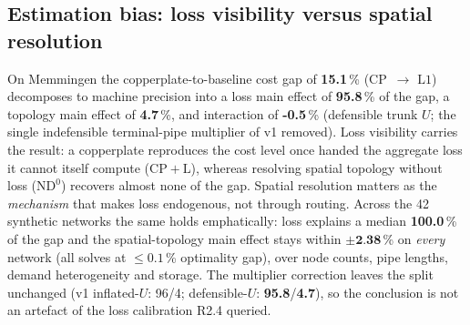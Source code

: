\documentclass[a4paper,fleqn]{cas-dc}
\newcommand{\CP}{\ensuremath{\mathrm{CP}}}      %
\newcommand{\CPL}{\ensuremath{\mathrm{CP{+}L}}} %
\newcommand{\NDz}{\ensuremath{\mathrm{ND^{0}}}} %
\newcommand{\Lone}{\ensuremath{\mathrm{L1}}}    %
\begin{document}
\subsection{Estimation bias: loss visibility versus spatial resolution}
On Memmingen the copperplate-to-baseline cost gap of \textbf{15.1}\,\%
(\CP\ $\to$ \Lone) decomposes to machine precision into a loss main effect of
\textbf{95.8}\,\% of the gap, a topology main effect of \textbf{4.7}\,\%,
and interaction of \textbf{-0.5}\,\% (defensible trunk $U$; the single
indefensible terminal-pipe multiplier of v1 removed). Loss visibility carries the
result: a copperplate reproduces the cost level once handed the aggregate loss it
cannot itself compute (\CPL), whereas resolving spatial topology without loss
(\NDz) recovers almost none of the gap. Spatial resolution matters as the
\emph{mechanism} that makes loss endogenous, not through routing. Across the 42
synthetic networks the same holds emphatically: loss explains a median
\textbf{100.0}\,\% of the gap and the spatial-topology main effect stays
within $\pm\textbf{2.38}$\,\% on \emph{every} network (all solves at
$\le0.1$\,\% optimality gap), over node counts, pipe lengths, demand heterogeneity and
storage. The multiplier correction leaves the split unchanged (v1 inflated-$U$: 96/4;
defensible-$U$: \textbf{95.8}/\textbf{4.7}), so the conclusion is not an
artefact of the loss calibration R2.4 queried.

\end{document}
